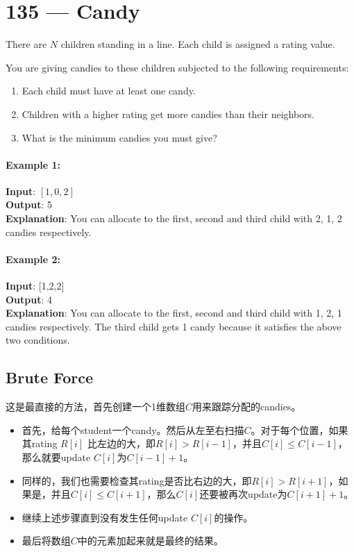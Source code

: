 \section{135 --- Candy}
There are $N$ children standing in a line. Each child is assigned a rating value.
\par
You are giving candies to these children subjected to the following requirements:
\begin{enumerate}
\item Each child must have at least one candy.
\item Children with a higher rating get more candies than their neighbors.
\item What is the minimum candies you must give?
\end{enumerate}
\paragraph{Example 1:}
\begin{flushleft}
\textbf{Input}: $[1,0,2]$
\\
\textbf{Output}: 5
\\
\textbf{Explanation}: You can allocate to the first, second and third child with 2, 1, 2 candies respectively.
\end{flushleft}
\paragraph{Example 2:}
\begin{flushleft}
\textbf{Input}: [1,2,2]
\\
\textbf{Output}: 4
\\
\textbf{Explanation}: You can allocate to the first, second and third child with 1, 2, 1 candies respectively. The third child gets 1 candy because it satisfies the above two conditions.
\end{flushleft}
\subsection{Brute Force}
这是最直接的方法，首先创建一个1维数组$C$用来跟踪分配的candies。
\begin{itemize}
\item 首先，给每个student一个candy。然后从左至右扫描$C$。对于每个位置，如果其rating $R[i]$ 比左边的大，即$R[i]>R[i-1]$，并且$C[i]\leq C[i-1]$，那么就要update $C[i]$为$C[i-1]+1$。
\item 同样的，我们也需要检查其rating是否比右边的大，即$R[i]>R[i+1]$，如果是，并且$C[i] \leq C[i+1]$，那么$C[i]$还要被再次update为$C[i+1]+1$。
\item 继续上述步骤直到没有发生任何update $C[i]$的操作。
\item 最后将数组$C$中的元素加起来就是最终的结果。
\end{itemize}
